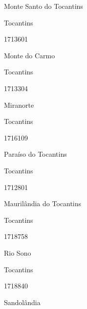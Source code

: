 \documentclass[
  letterpaper,
]{report}
\begin{document}
Monte Santo do Tocantins

\n    

\n    

\n      

Tocantins

\n      

1713601

\n      

Monte do Carmo

\n    

\n    

\n      

Tocantins

\n      

1713304

\n      

Miranorte

\n    

\n    

\n      

Tocantins

\n      

1716109

\n      

Paraíso do Tocantins

\n    

\n    

\n      

Tocantins

\n      

1712801

\n      

Maurilândia do Tocantins

\n    

\n    

\n      

Tocantins

\n      

1718758

\n      

Rio Sono

\n    

\n    

\n      

Tocantins

\n      

1718840

\n      

Sandolândia

\n    

\n    

\n      
\end{document}
